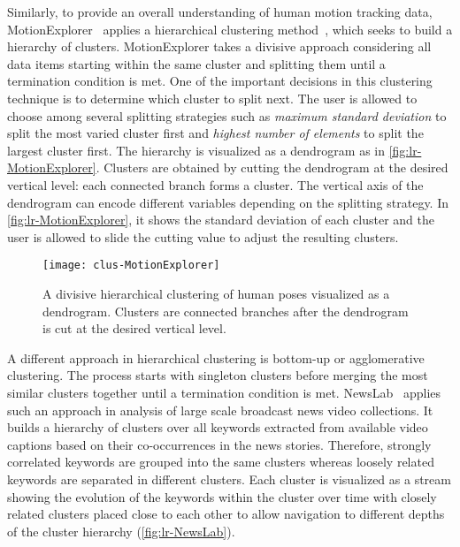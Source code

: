 Similarly, to provide an overall understanding of human motion tracking data, MotionExplorer~\cite{Bernard2013} applies a hierarchical clustering method~\cite{Han2011}, which seeks to build a hierarchy of clusters. MotionExplorer takes a divisive approach considering all data items starting within the same cluster and splitting them until a termination condition is met. One of the important decisions in this clustering technique is to determine which cluster to split next. The user is allowed to choose among several splitting strategies such as \emph{maximum standard deviation} to split the most varied cluster first and \emph{highest number of elements} to split the largest cluster first. The hierarchy is visualized as a dendrogram as in \autoref{fig:lr-MotionExplorer}. Clusters are obtained by cutting the dendrogram at the desired vertical level: each connected branch forms a cluster. The vertical axis of the dendrogram can encode different variables depending on the splitting strategy. In \autoref{fig:lr-MotionExplorer}, it shows the standard deviation of each cluster and the user is allowed to slide the cutting value to adjust the resulting clusters.

\begin{figure}[!htb]
	\centering
	\texttt{[image: clus-MotionExplorer]}
	\caption[A divisive hierarchical clustering of human poses]{A divisive hierarchical clustering of human poses visualized as a dendrogram. Clusters are connected branches after the dendrogram is cut at the desired vertical level. }
	\label{fig:lr-MotionExplorer}
\end{figure}

A different approach in hierarchical clustering is bottom-up or agglomerative clustering. The process starts with singleton clusters before merging the most similar clusters together until a termination condition is met. NewsLab~\cite{Ghoniem2007} applies such an approach in analysis of large scale broadcast news video collections. It builds a hierarchy of clusters over all keywords extracted from available video captions based on their co-occurrences in the news stories. Therefore, strongly correlated keywords are grouped into the same clusters whereas loosely related keywords are separated in different clusters. Each cluster is visualized as a stream showing the evolution of the keywords within the cluster over time with closely related clusters placed close to each other to allow navigation to different depths of the cluster hierarchy (\autoref{fig:lr-NewsLab}).

